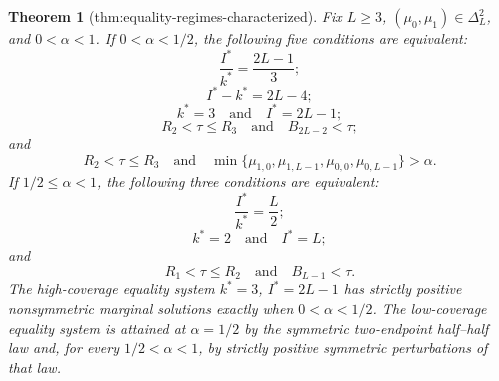 \documentclass{article}
\newtheorem{theorem}{Theorem}
\begin{document}
\begin{theorem}[thm:equality-regimes-characterized]\label{thm:equality-regimes-characterized}
Fix \(L\geq3\), \((\mu_0,\mu_1)\in\Delta_L^2\), and \(0<\alpha<1\).  If \(0<\alpha<1/2\), the following five conditions are equivalent:
\[
\frac{I^*}{k^*}=\frac{2L-1}{3};
\]
\[
I^*-k^*=2L-4;
\]
\[
k^*=3\quad\text{and}\quad I^*=2L-1;
\]
\[
R_2<\tau\leq R_3\quad\text{and}\quad B_{2L-2}<\tau;
\]
and
\[
R_2<\tau\leq R_3
\quad\text{and}\quad
\min\{\mu_{1,0},\mu_{1,L-1},\mu_{0,0},\mu_{0,L-1}\}>\alpha.
\]
If \(1/2\leq\alpha<1\), the following three conditions are equivalent:
\[
\frac{I^*}{k^*}=\frac L2;
\]
\[
k^*=2\quad\text{and}\quad I^*=L;
\]
and
\[
R_1<\tau\leq R_2\quad\text{and}\quad B_{L-1}<\tau.
\]
The high-coverage equality system \(k^*=3\), \(I^*=2L-1\) has strictly positive nonsymmetric marginal solutions exactly when \(0<\alpha<1/2\).  The low-coverage equality system is attained at \(\alpha=1/2\) by the symmetric two-endpoint half--half law and, for every \(1/2<\alpha<1\), by strictly positive symmetric perturbations of that law.
\end{theorem}
\end{document}
